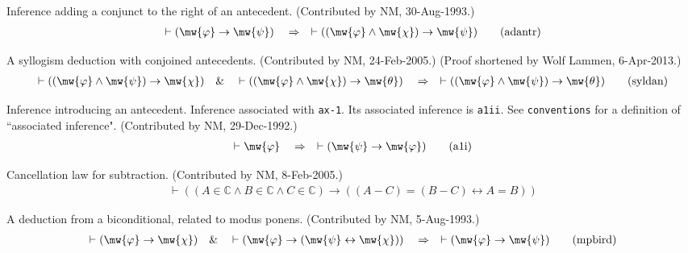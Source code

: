 \begin{lemma} Inference adding a conjunct to the right of
an antecedent.  (Contributed
       by NM, 30-Aug-1993.)
\begin{align}
\vdash ( \mw{\varphi} \rightarrow \mw{\psi} )\quad\Rightarrow\quad \vdash ( (
    \mw{\varphi} \wedge \mw{\chi} ) \rightarrow \mw{\psi}
    )\label{eq:adantr}\tag{adantr}
\end{align}
\end{lemma}


\begin{lemma} A syllogism deduction with conjoined
antecedents.  (Contributed by NM,
       24-Feb-2005.)  (Proof shortened by Wolf Lammen, 6-Apr-2013.)
\begin{align}
\vdash ( ( \mw{\varphi} \wedge \mw{\psi} ) \rightarrow \mw{\chi} )\quad\&\quad
    \vdash ( ( \mw{\varphi} \wedge \mw{\chi} ) \rightarrow \mw{\theta}
    )\quad\Rightarrow\quad \vdash ( ( \mw{\varphi} \wedge \mw{\psi} )
    \rightarrow \mw{\theta} )\label{eq:syldan}\tag{syldan}
\end{align}
\end{lemma}


\begin{lemma} Inference introducing an antecedent.  Inference
associated with {\tt ax-1}.
       Its associated inference is {\tt a1ii}.  See {\tt conventions} for a
definition
       of ``associated inference".  (Contributed by NM, 29-Dec-1992.)
\begin{align}
\vdash \mw{\varphi}\quad\Rightarrow\quad \vdash ( \mw{\psi} \rightarrow
    \mw{\varphi} )\label{eq:a1i}\tag{a1i}
\end{align}
\end{lemma}


\begin{lemma} Cancellation law for subtraction. 
(Contributed by NM, 8-Feb-2005.)
\begin{align}
\vdash ( ( A \in \mathbb{C} \wedge B \in \mathbb{C} \wedge C \in \mathbb{C} )
    \rightarrow ( ( A \minus C ) = ( B \minus C ) \leftrightarrow A = B )
    )\label{eq:subcan2}\tag{subcan2}
\end{align}
\end{lemma}


\begin{lemma} A deduction from a biconditional, related to
modus ponens.  (Contributed
       by NM, 5-Aug-1993.)
\begin{align}
\vdash ( \mw{\varphi} \rightarrow \mw{\chi} )\quad\&\quad \vdash ( \mw{\varphi}
    \rightarrow ( \mw{\psi} \leftrightarrow \mw{\chi} ) )\quad\Rightarrow\quad
    \vdash ( \mw{\varphi} \rightarrow \mw{\psi} )\label{eq:mpbird}\tag{mpbird}
\end{align}
\end{lemma}


